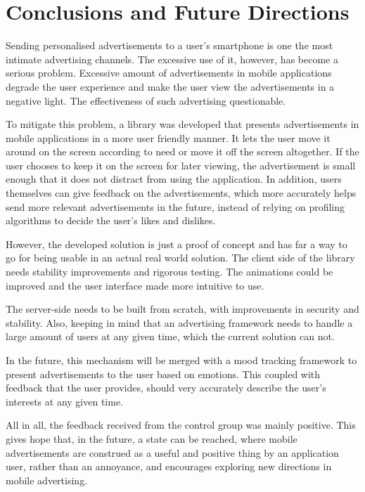 \chapter{Conclusions and Future Directions}

Sending personalised advertisements to a user's smartphone is one the most intimate advertising channels. The excessive use of it, however, has become a serious problem. Excessive amount of advertisements in mobile applications degrade the user experience and make the user view the advertisements in a negative light. The effectiveness of such advertising questionable.

To mitigate this problem, a library was developed that presents advertisements in mobile applications in a more user friendly manner. It lets the user move it around on the screen according to need or move it off the screen altogether. If the user chooses to keep it on the screen for later viewing, the advertisement is small enough that it does not distract from using the application. In addition, users themselves can give feedback on the advertisements, which more accurately helps send more relevant advertisements in the future, instead of relying on profiling algorithms to decide the user's likes and dislikes.

However, the developed solution is just a proof of concept and has far a way to go for being usable in an actual real world solution. The client side of the library needs stability improvements and rigorous testing. The animations could be improved and the user interface made more intuitive to use.

The server-side needs to be built from scratch, with improvements in security and stability. Also, keeping in mind that an advertising framework needs to handle a large amount of users at any given time, which the current solution can not.

In the future, this mechanism will be merged with a mood tracking framework to present advertisements to the user based on emotions. This coupled with feedback that the user provides, should very accurately describe the user's interests at any given time.

All in all, the feedback received from the control group was mainly positive. This gives hope that, in the future, a state can be reached, where mobile advertisements are construed as a useful and positive thing by an application user, rather than an annoyance, and encourages exploring new directions in mobile advertising.